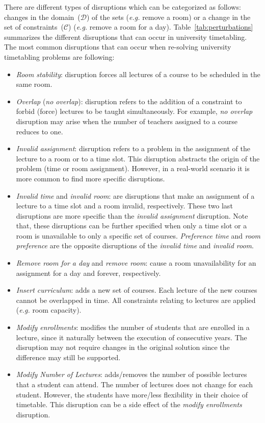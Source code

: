 \documentclass[twocolumn,natbib]{svjour3}          %
\newcounter{constraint}
\begin{document}
There are different types of disruptions which can be categorized as follows: changes in the domain~($\mathcal{D}$) of the sets (\emph{e.g.} remove a room) or a change in the set of constraints~($\mathcal{C}$) (\emph{e.g.} remove a room for a day). Table~\ref{tab:perturbations} summarizes the different disruptions that can occur in university timetabling.  The most common disruptions that can occur when re-solving university timetabling problems are following:

\begin{itemize}
\item {\it Room stability}: disruption forces all lectures of a course to be scheduled in the same room.
\item {\it Overlap} ({\it no overlap}): disruption refers to the addition of a constraint to forbid (force) lectures to be taught simultaneously. For example, {\it no overlap} disruption may arise when the number of teachers assigned to a course reduces to one.
\item  {\it Invalid assignment}: disruption refers to a problem in the assignment of the lecture to a room or to a time slot. This disruption abstracts the origin of the problem (time or room assignment). However, in a real-world scenario it is more common to find more specific disruptions.  
\item {\it Invalid time} and {\it invalid room}: are disruptions that make an assignment of a lecture to a time slot and a room invalid, respectively. These two last disruptions are more specific than the {\it invalid assignment} disruption. Note that, these disruptions can be further specified when only a time slot or a room is unavailable to only a specific set of courses. {\it Preference time} and {\it room preference} are the opposite disruptions of the {\it invalid time } and {\it invalid room}.
\item {\it Remove room for a day} and {\it remove room}: cause a room unavailability for an assignment for a day and forever, respectively.
\item  {\it Insert curriculum}: adds a new set of courses. Each lecture of the new courses cannot be overlapped in time. All constraints relating to lectures are applied (\emph{e.g.} room capacity).
\item {\it Modify enrollments}: modifies the number of students that are enrolled in a lecture, since it naturally between the execution of consecutive years. The disruption may not require changes in the original solution since the difference may still be supported.  
\item {\it Modify Number of Lectures}: adds/removes the number of possible lectures that a student can attend. The number of lectures does not change for each student. However, the students have more/less flexibility in their choice of timetable. This disruption can be a side effect of the {\it modify enrollments} disruption.
\end{itemize}
    
\end{document}
